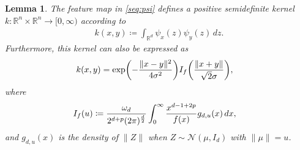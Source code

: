 \documentclass{article}
\newtheorem{lemma}[theorem]{Lemma}
\theoremstyle{definition}
\newcommand{\reals}{\mathbb{R}}
\newcommand{\normal}{\mathcal{N}}
\let\originalleft\left
\let\originalright\right
\renewcommand{\left}{\mathopen{}\mathclose\bgroup\originalleft}
\renewcommand{\right}{\aftergroup\egroup\originalright}
\begin{document}
\begin{lemma} The feature map in \eqref{seq:psi} defines a positive semidefinite kernel  $k \colon \reals^n \times \reals^n \to [0, \infty)$ according to  
\begin{align}
k(x,y) \coloneqq \int_{\reals^d} \psi_x(z) \psi_y(z) \, dz.
\end{align} 
Furthermore, this kernel can also be expressed as
\begin{align}
     k(x,y) & = \exp\left( -\frac{ \|x-y\|^2}{ 4 \sigma^2}\right) I_f\left( \frac{ \|x+y\|}{\sqrt{2} \sigma} \right), \label{seq_kernel_f}
\end{align}
where
\begin{align}
    I_f(u) &\coloneqq \frac{ \omega_d}{2^{d + p} ( 2\pi)^{\frac{d}{2}} }\int_0^\infty  \frac{ x^{d-1+2p}}{ f(x)} g_{d,u}\left(x \right)   \, dx, \label{eq:If} 
\end{align}
and $g_{d,u}(x)$ is the density of $\|Z\|$ when $Z \sim \normal(\mu, I_d)$ with $\|\mu\| = u$.
\end{lemma}
\end{document}
